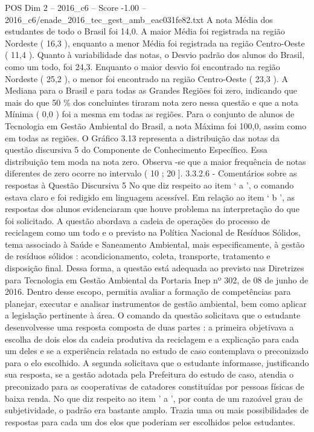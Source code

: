 \begin{textsample}{POS Dim 2 – 2016\_c6 – Score -1.00 – 2016\_c6/enade\_2016\_tec\_gest\_amb\_eac031fe82.txt}
A nota Média dos estudantes de todo o Brasil foi 14,0.
A maior Média foi registrada na região Nordeste ( 16,3 ), enquanto a menor Média foi registrada na região Centro-Oeste ( 11,4 ).
Quanto à variabilidade das notas, o Desvio padrão dos alunos do Brasil, como um todo, foi 24,3.
Enquanto o maior desvio foi encontrado na região Nordeste ( 25,2 ), o menor foi encontrado na região Centro-Oeste ( 23,3 ).
A Mediana para o Brasil e para todas as Grandes Regiões foi zero, indicando que mais do que 50 \% dos concluintes tiraram nota zero nessa questão e que a nota Mínima ( 0,0 ) foi a mesma em todas as regiões.
Para o conjunto de alunos de Tecnologia em Gestão Ambiental do Brasil, a nota Máxima foi 100,0, assim como em todas as regiões.
O Gráfico 3.13 representa a distribuição das notas da questão discursiva 5 do Componente de Conhecimento Específico.
Essa distribuição tem moda na nota zero.
Observa -se que a maior frequência de notas diferentes de zero ocorre no intervalo ( 10 ; 20 ]. 3.3.2.6 - Comentários sobre as respostas à Questão Discursiva 5 No que diz respeito ao item ‘ a ’, o comando estava claro e foi redigido em linguagem acessível.
Em relação ao item ‘ b ’, as respostas dos alunos evidenciaram que houve problema na interpretação do que foi solicitado.
A questão abordava a cadeia de operações do processo de reciclagem como um todo e o previsto na Política Nacional de Resíduos Sólidos, tema associado à Saúde e Saneamento Ambiental, mais especificamente, à gestão de resíduos sólidos : acondicionamento, coleta, transporte, tratamento e disposição final.
Dessa forma, a questão está adequada ao previsto nas Diretrizes para Tecnologia em Gestão Ambiental da Portaria Inep nº 302, de 08 de junho de 2016.
Dentro desse escopo, permitia avaliar a formação de competências para planejar, executar e analisar instrumentos de gestão ambiental, bem como aplicar a legislação pertinente à área.
O comando da questão solicitava que o estudante desenvolvesse uma resposta composta de duas partes : a primeira objetivava a escolha de dois elos da cadeia produtiva da reciclagem e a explicação para cada um deles e se a experiência relatada no estudo de caso contemplava o preconizado para o elo escolhido.
A segunda solicitava que o estudante informasse, justificando sua resposta, se a gestão adotada pela Prefeitura do estudo de caso, atendia o preconizado para as cooperativas de catadores constituídas por pessoas físicas de baixa renda.
No que diz respeito ao item ’ a ’, por conta de um razoável grau de subjetividade, o padrão era bastante amplo.
Trazia uma ou mais possibilidades de respostas para cada um dos elos que poderiam ser escolhidos pelos estudantes.

\end{textsample}
